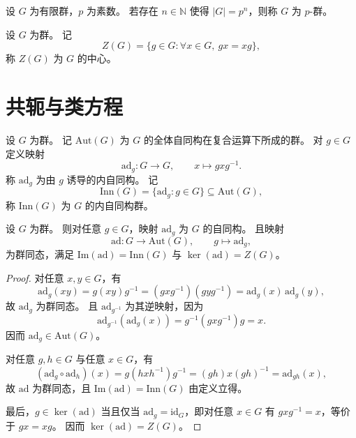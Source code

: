 \documentclass[lang=cn,a4paper,newtx]{elegantbook}
\begin{document}
\begin{definition}[$p$-群]
  设 $G$ 为有限群，$p$ 为素数。
  若存在 $n\in\mathbb N$ 使得 $|G|=p^n$，则称 $G$ 为 $p$-群。
\end{definition}

\begin{definition}[中心]
  设 $G$ 为群。
  记
  \[
    Z(G)=\{g\in G:\forall x\in G,\ gx=xg\},
  \]
  称 $Z(G)$ 为 $G$ 的中心。
\end{definition}

\section{共轭与类方程}

\begin{definition}[自同构群与内自同构群]
  设 $G$ 为群。
  记 $\mathrm{Aut}(G)$ 为 $G$ 的全体自同构在复合运算下所成的群。
  对 $g\in G$ 定义映射
  \[
    \mathrm{ad}_g:G\to G,\qquad x\mapsto gxg^{-1}.
  \]
  称 $\mathrm{ad}_g$ 为由 $g$ 诱导的内自同构。
  记
  \[
    \mathrm{Inn}(G)=\{\mathrm{ad}_g:g\in G\}\subseteq \mathrm{Aut}(G),
  \]
  称 $\mathrm{Inn}(G)$ 为 $G$ 的内自同构群。
\end{definition}

\begin{proposition}\label{ad-homomorphism}
  设 $G$ 为群。
  则对任意 $g\in G$，映射 $\mathrm{ad}_g$ 为 $G$ 的自同构。
  且映射
  \[
    \mathrm{ad}:G\to\mathrm{Aut}(G),\qquad g\mapsto \mathrm{ad}_g,
  \]
  为群同态，满足 $\mathrm{Im}(\mathrm{ad})=\mathrm{Inn}(G)$ 与 $\ker(\mathrm{ad})=Z(G)$。
\end{proposition}

\begin{proof}
  对任意 $x,y\in G$，有
  \[
    \mathrm{ad}_g(xy)=g(xy)g^{-1}=(gxg^{-1})(gyg^{-1})=\mathrm{ad}_g(x)\,\mathrm{ad}_g(y),
  \]
  故 $\mathrm{ad}_g$ 为群同态。
  且 $\mathrm{ad}_{g^{-1}}$ 为其逆映射，因为
  \[
    \mathrm{ad}_{g^{-1}}(\mathrm{ad}_g(x))=g^{-1}(gxg^{-1})g=x.
  \]
  因而 $\mathrm{ad}_g\in\mathrm{Aut}(G)$。

  对任意 $g,h\in G$ 与任意 $x\in G$，有
  \[
    (\mathrm{ad}_g\circ\mathrm{ad}_h)(x)=g(hxh^{-1})g^{-1}=(gh)x(gh)^{-1}=\mathrm{ad}_{gh}(x),
  \]
  故 $\mathrm{ad}$ 为群同态，且 $\mathrm{Im}(\mathrm{ad})=\mathrm{Inn}(G)$ 由定义立得。

  最后，$g\in\ker(\mathrm{ad})$ 当且仅当 $\mathrm{ad}_g=\mathrm{id}_G$，即对任意 $x\in G$ 有 $gxg^{-1}=x$，等价于 $gx=xg$。
  因而 $\ker(\mathrm{ad})=Z(G)$。
\end{proof}
\end{document}
